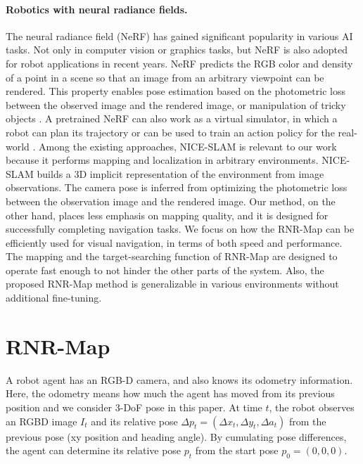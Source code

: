 \documentclass[10pt,twocolumn,letterpaper]{article}
\def\proposed{RNR-Map\xspace}
\begin{document}
\paragraph{Robotics with neural radiance fields.}
%
The neural radiance field (NeRF) \cite{Nerf} has gained significant popularity in various AI tasks.
%
Not only in computer vision or graphics tasks, but NeRF is also adopted for robot applications in recent years.
%
NeRF predicts the RGB color and density of a point in a scene so that an image from an arbitrary viewpoint can be rendered.
%
This property enables pose estimation \cite{imap, barf, nerf-loc, nerf-navi} based on the photometric loss between the observed image and the rendered image, or manipulation of tricky objects \cite{nerf-dex, nerf-grasp2, nerf-dy, nerf-multi, nerf-grasp}.
%
A pretrained NeRF can also work as a virtual simulator, in which a robot can plan its trajectory \cite{nerf-navi} or can be used to train an action policy for the real-world \cite{nerf-sim2real}.
%
Among the existing approaches, NICE-SLAM \cite{nice-slam} is relevant to our work because it performs mapping and localization in arbitrary environments.
%
NICE-SLAM builds a 3D implicit representation of the environment from image observations. 
%
The camera pose is inferred from optimizing the photometric loss between the observation image and the rendered image.  
%
Our method, on the other hand, places less emphasis on mapping quality, and it is designed for successfully completing navigation tasks.
%
We focus on how the \proposed can be efficiently used for visual navigation, in terms of both speed and performance.
%
The mapping and the target-searching function of \proposed are designed to operate fast enough to not hinder the other parts of the system.
%
Also, the proposed \proposed method is generalizable in various environments without additional fine-tuning.


\section{\proposed } \label{sec:latent}
A robot agent has an RGB-D camera, and also knows its odometry information. 
%
Here, the odometry means how much the agent has moved from its previous position and we consider 3-DoF pose in this paper.
% 
%
At time $t$, the robot observes an RGBD image $I_t$ and its relative pose $\Delta p_t = (\Delta x_t,\Delta y_t,\Delta a_t)$ from the previous pose (xy position and heading angle).
%
By cumulating pose differences, the agent can determine its relative pose $p_{t}$ from the start pose $p_0=(0,0,0)$. 
\end{document}
